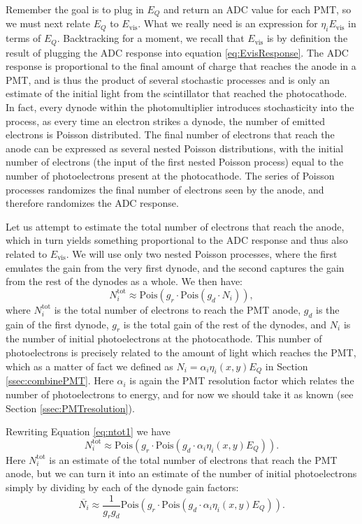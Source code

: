 Remember the goal is to plug in $E_Q$ and return an ADC value for each PMT, so we must next
relate $E_Q$ to $E_{\mathrm{vis}}$. What we really need is an expression for $\eta_iE_{\mathrm{vis}}$ in terms of $E_Q$.
Backtracking for a moment, we recall that $E_{\mathrm{vis}}$ is by definition the result
of plugging the ADC response into equation \ref{eq:EvisResponse}. The ADC response is proportional to the final amount of charge
that reaches the anode in a PMT, and is thus the product
of several stochastic processes and is only an estimate of the initial light from the scintillator that reached
the photocathode. In fact, every dynode within the photomultiplier introduces stochasticity into the process, as every time an electron
strikes a dynode, the number of emitted electrons is Poisson distributed. The final number of electrons that reach the anode
can be expressed as several nested Poisson distributions,
with the initial number of electrons (the input of the first nested Poisson process)
equal to the number of photoelectrons present at the photocathode. The series of Poisson
processes randomizes the final number of electrons seen by the anode, and therefore randomizes the ADC response.

Let us attempt to estimate the total number of electrons that reach the anode, which in turn yields something
proportional to the ADC response and thus also related to $E_{\mathrm{vis}}$. We will use only two nested Poisson
processes, where the first emulates the gain from the very first dynode, and the second captures the gain from the rest of
the dynodes as a whole. We then have:
%
\begin{equation}
  N_i^{\mathrm{tot}} \approx \mathrm{Pois}(g_r \cdot \mathrm{Pois}(g_d \cdot N_i)),
  \label{eq:ntot1}
\end{equation}
%
where $N_i^{\mathrm{tot}}$ is the total number of electrons to reach the PMT anode, $g_d$ is the gain of the first dynode,
$g_r$ is the total gain of the rest of the dynodes, and $N_i$ is the number of initial photoelectrons at the photocathode.
This number of photoelectrons is precisely related to the amount of light which reaches the PMT, which as a matter of fact
we defined as $N_i = \alpha_i \eta_i(x,y) E_Q$ in Section \ref{ssec:combinePMT}. Here $\alpha_i$ is again the PMT resolution
factor which relates the number of photoelectrons to energy, and for now we should take it as known (see Section
\ref{ssec:PMTresolution}).

Rewriting Equation \ref{eq:ntot1} we have
\begin{equation}
  N_i^{\mathrm{tot}} \approx \mathrm{Pois}(g_r \cdot \mathrm{Pois}(g_d \cdot \alpha_i \eta_i(x,y) E_Q)).
  \label{eq:ntot2}
\end{equation}
Here $N_i^{\mathrm{tot}}$ is an estimate of the total number of electrons that reach the PMT anode, but we can turn it
into an estimate of the number of initial photoelectrons simply by dividing by each of the dynode gain factors:
\begin{equation}
  \overline{N_i} \approx \frac{1}{g_rg_d}\mathrm{Pois}(g_r \cdot \mathrm{Pois}(g_d \cdot \alpha_i \eta_i(x,y) E_Q)).
  \label{eq:ntot3}
\end{equation}

